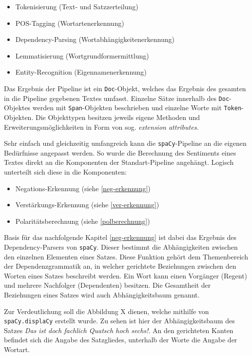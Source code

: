 \begin{itemize}
\item Tokenisierung (Text- und Satzzerteilung)
\item POS-Tagging (Wortartenerkennung)
\item Dependency-Parsing (Wortabhängigkeitenerkennung)
\item Lemmatisierung (Wortgrundformermittlung)
\item Entity-Recognition (Eigennamenerkennung)
\end{itemize}

Das Ergebnis der Pipeline ist ein \texttt{Doc}-Objekt, welches das Ergebnis des gesamten in die Pipeline gegebenen Textes umfasst. 
Einzelne Sätze innerhalb des \texttt{Doc}-Objektes werden mit \texttt{Span}-Objekten beschrieben und einzelne Worte mit \texttt{Token}-Objekten. 
Die Objekttypen besitzen jeweils eigene Methoden und Erweiterungsmöglichkeiten in Form von sog. \textit{extension attributes}. 

Sehr einfach und gleichzeitig umfangreich kann die \texttt{spaCy}-Pipeline an die eigenen Bedürfnisse angepasst werden. 
So wurde die Berechnung des Sentiments eines Textes direkt an die Komponenten der Standart-Pipeline angehängt. 
Logisch unterteilt sich diese in die Komponenten:

\begin{itemize}
\item Negations-Erkennung (siehe \ref{neg-erkennung})
\item Verstärkungs-Erkennung (siehe \ref{ver-erkennung})
\item Polaritätsberechnung (siehe \ref{polberechnung})
\end{itemize}

Basis für das nachfolgende Kapitel \ref{neg-erkennung} ist dabei das Ergebnis des Dependency-Parsers von \texttt{spaCy}. 
Dieser bestimmt die Abhängigkeiten zwischen den einzelnen Elementen eines Satzes. 
Diese Funktion gehört dem Themenbereich der Dependenzgrammatik an, in welcher gerichtete Beziehungen zwischen den Worten eines Satzes beschreibt werden. 
Ein Wort kann einen Vorgänger (Regent) und mehrere Nachfolger (Dependenten) besitzen. 
Die Gesamtheit der Beziehungen eines Satzes wird auch Abhängigkeitsbaum genannt. 

Zur Verdeutlichung soll die Abbildung X dienen, welche mithilfe von \texttt{spaCy.displaCy} erstellt wurde. 
Zu sehen ist hier der Abhängigkeitsbaum des Satzes \textit{\glqq Das ist doch fachlich Quatsch hoch sechs!\grqq}. 
An den gerichteten Kanten befindet sich die Angabe des Satzgliedes, unterhalb der Worte die Angabe der Wortart. 

